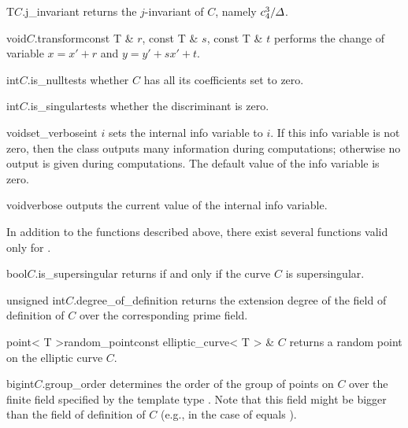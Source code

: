 \begin{cfcode}{T}{$C$.j_invariant}{}
  returns the $j$-invariant of $C$, namely $c_4^3 / \varDelta$.
\end{cfcode}

\begin{fcode}{void}{$C$.transform}{const T & $r$, const T & $s$, const T & $t$}
  performs the change of variable $x = x' +r$ and $y = y' + s x' + t$.
\end{fcode}

\begin{cfcode}{int}{$C$.is_null}{}tests whether $C$ has all its coefficients set to zero.
\end{cfcode}

\begin{cfcode}{int}{$C$.is_singular}{}tests whether the discriminant is zero.
\end{cfcode}

\begin{fcode}{void}{set_verbose}{int $i$}
  sets the internal info variable to $i$.  If this info variable is not zero, then the class
  outputs many information during computations; otherwise no output is given during
  computations.  The default value of the info variable is zero.
\end{fcode}

\begin{cfcode}{void}{verbose}{}
  outputs the current value of the internal info variable.
\end{cfcode}

In addition to the functions described above, there exist several functions valid only for
.

\begin{fcode}{bool}{$C$.is_supersingular}{}
  returns \TRUE if and only if the curve $C$ is supersingular.
\end{fcode}

\begin{cfcode}{unsigned int}{$C$.degree_of_definition}{}
  returns the extension degree of the field of definition of $C$ over the corresponding prime
  field.
\end{cfcode}

\begin{fcode}{point< T >}{random_point}{const elliptic_curve< T > & $C$}
  returns a random point on the elliptic curve $C$.
\end{fcode}

\begin{fcode}{bigint}{$C$.group_order}{}
  determines the order of the group of points on $C$ over the finite field specified by the
  template type .  Note that this field might be bigger than the field of definition of
  $C$ (e.g., in the case of  equals ).
\end{fcode}


